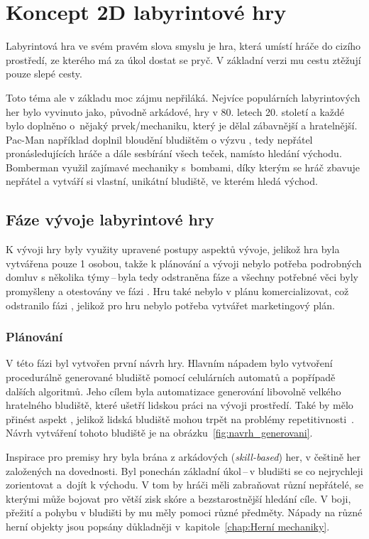 \chapter{Koncept 2D labyrintové hry}
Labyrintová hra ve svém pravém slova smyslu je hra, která umístí hráče do cizího prostředí, ze kterého má za úkol dostat se pryč. V základní verzi mu cestu ztěžují pouze slepé cesty. 

Toto téma ale v základu moc zájmu nepřiláká. Nejvíce populárních labyrintových her bylo vyvinuto jako, původně arkádové, hry v 80. letech 20. století a každé bylo doplněno o~nějaký prvek/mechaniku, který je dělal zábavnější a hratelnější. Pac-Man například doplnil bloudění bludištěm o výzvu , tedy nepřátel pronásledujících hráče a dále sesbírání všech teček, namísto hledání východu. Bomberman využil zajímavé mechaniky s~bombami, díky kterým se hráč zbavuje nepřátel a vytváří si vlastní, unikátní bludiště, ve kterém hledá východ.

\section{Fáze vývoje labyrintové hry}
K vývoji hry byly využity upravené postupy aspektů vývoje, jelikož hra byla vytvářena pouze 1 osobou, takže k plánování a vývoji nebylo potřeba podrobných domluv s několika týmy\,--\,byla tedy odstraněna fáze  a všechny potřebné věci byly promyšleny a otestovány ve fázi . Hru také nebylo v plánu komercializovat, což odstranilo fázi , jelikož pro hru nebylo potřeba vytvářet marketingový plán.

\subsection*{Plánování}
V této fázi byl vytvořen první návrh hry. Hlavním nápadem bylo vytvoření procedurálně generované bludiště pomocí celulárních automatů a popřípadě dalších algoritmů. Jeho cílem byla automatizace generování libovolně velkého hratelného bludiště, které ušetří lidskou práci na vývoji prostředí. Také by mělo přinést aspekt , jelikož lidská bludiště mohou trpět na problémy repetitivnosti~\cite{Procedural_Game_Map}. Návrh vytváření tohoto bludiště je na obrázku~\ref{fig:navrh_generovani}.

Inspirace pro premisy hry byla brána z arkádových (\textit{skill-based}) her, v češtině her založených na dovednosti. Byl ponechán základní úkol\,--\,v bludišti se co nejrychleji zorientovat a~dojít k východu. V tom by hráči měli zabraňovat různí nepřátelé, se kterými může bojovat pro větší zisk skóre a bezstarostnější hledání cíle. V boji, přežití a pohybu v bludišti  by mu měly pomoci různé předměty. Nápady na různé herní objekty jsou popsány důkladněji v~kapitole~\ref{chap:Herní mechaniky}.

